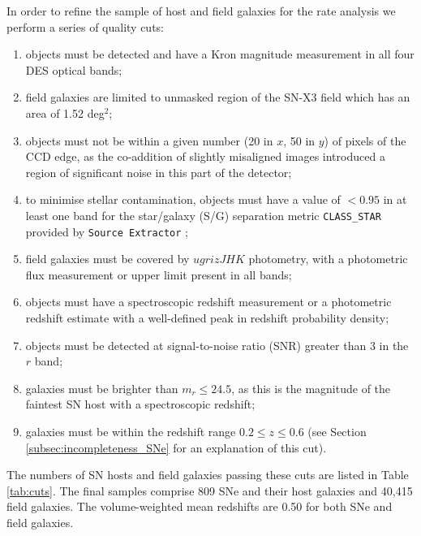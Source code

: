 \documentclass[fleqn,usenatbib]{mnras}
\begin{document}
In order to refine the sample of host and field galaxies for the rate analysis we perform a series of quality cuts:

\begin{enumerate}
    \item objects must be detected and have a Kron magnitude measurement in all four DES optical bands;
    
    \item field galaxies are limited to unmasked region of the SN-X3 field \citep{Hartley2020} which has an area of 1.52 deg$^2$;
    
    \item objects must not be within a given number (20 in $x$, 50 in $y$) of pixels of the CCD edge, as the co-addition of slightly misaligned images introduced a region of significant noise in this part of the detector;
    
    \item to minimise stellar contamination, objects must have a value of $<0.95$ in at least one band for the star/galaxy (S/G) separation metric \texttt{CLASS\_STAR} provided by \texttt{Source Extractor} \citep{Bertin1996};
    
    \item field galaxies must be covered by $ugrizJHK$ photometry, with a photometric flux measurement or upper limit present in all bands;
    
    \item objects must have a spectroscopic redshift measurement or a photometric redshift estimate with a well-defined peak in redshift  probability density;
    
    \item objects must be detected at signal-to-noise ratio (SNR) greater than 3 in the $r$ band;
    
    \item galaxies must be brighter than $m_r \leq 24.5$, as this is the magnitude of the faintest SN host with a spectroscopic redshift;
    
    \item galaxies must be within the redshift range $0.2 \leq z \leq 0.6$ (see Section \ref{subsec:incompleteness_SNe} for an explanation of this cut).
\end{enumerate}

The numbers of SN hosts and field galaxies passing these cuts are listed in Table \ref{tab:cuts}. The final samples comprise 809 SNe and their host galaxies and 40,415 field galaxies. The volume-weighted mean redshifts are 0.50 for both SNe and field galaxies.
\end{document}

